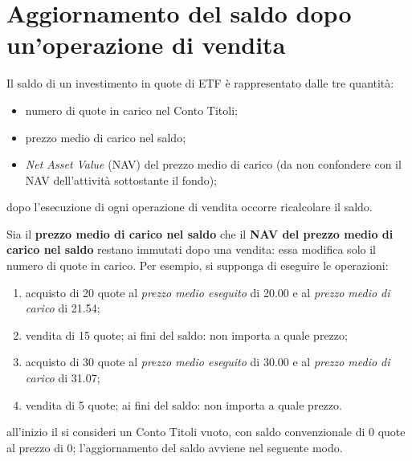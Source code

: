 \documentclass[12pt,a4paper]{article}
\newcommand{\Eur}[1]{\SI{#1}{\text{\euro{}}}}
\begin{document}
\section{Aggiornamento del saldo dopo un'operazione di vendita}


Il saldo di un investimento in quote di ETF è rappresentato dalle tre quantità:
\begin{itemize}
\item numero di quote in carico nel Conto Titoli;
\item prezzo medio di carico nel saldo;
\item \emph{Net Asset Value} (NAV) del prezzo  medio di carico (da non confondere con
  il NAV dell'attività  sottostante il fondo);
\end{itemize}
dopo l'esecuzione di ogni operazione di vendita occorre ricalcolare il saldo.

Sia il \textbf{prezzo medio di carico nel  saldo} che il \textbf{NAV del prezzo medio
   di carico  nel saldo}  restano immutati  dopo una vendita:  essa modifica  solo il
numero di quote in carico.  Per esempio, si supponga di eseguire le operazioni:
\begin{enumerate}
\item acquisto di \num{20} quote al  \emph{prezzo medio eseguito} di \Eur{20,00} e al
  \emph{prezzo medio di carico} di \Eur{21,54};
\item vendita di \num{15} quote; ai fini del saldo: non importa a quale prezzo;
\item acquisto di \num{30} quote al  \emph{prezzo medio eseguito} di \Eur{30,00} e al
  \emph{prezzo medio di carico} di \Eur{31,07};
\item vendita di \num{5} quote; ai fini del saldo: non importa a quale prezzo.
\end{enumerate}
all'inizio il si consideri un Conto  Titoli vuoto, con saldo convenzionale di \num{0}
quote al prezzo di \Eur{0}; l'aggiornamento del saldo avviene nel seguente modo.
\end{document}
